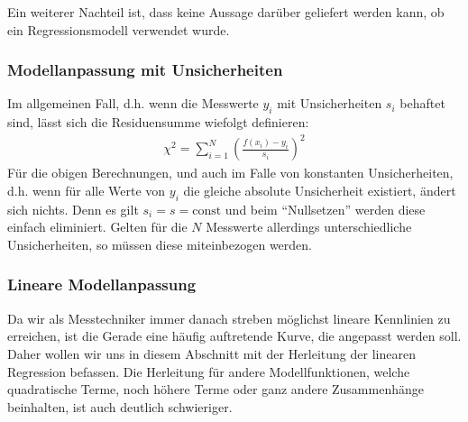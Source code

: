 \documentclass[letterpaper,10pt,english]{jupyterBook}
\begin{document}
\sphinxAtStartPar
Ein weiterer Nachteil ist, dass keine Aussage darüber geliefert werden kann, ob ein  Regressionsmodell verwendet wurde.


\subsubsection{Modellanpassung mit Unsicherheiten }
\label{\detokenize{content/1_Kurvenanpassung:modellanpassung-mit-unsicherheiten-a-id-subsec-modellanpassung-unsicherheiten-a}}
\sphinxAtStartPar
Im allgemeinen Fall, d.h. wenn die Messwerte \(y_i\) mit Unsicherheiten \(s_i\) behaftet sind, lässt sich die Residuensumme wiefolgt definieren:
\begin{equation*}
\begin{split}\chi^2 = \sum_{i=1}^N \left(\frac{f(x_i)-y_i}{s_i}\right)^2\end{split}
\end{equation*}
\sphinxAtStartPar
Für die obigen Berechnungen, und auch im Falle von konstanten Unsicherheiten, d.h. wenn für alle Werte von \(y_i\) die gleiche absolute Unsicherheit existiert, ändert sich nichts. Denn es gilt \(s_i = s = \mathrm{const}\) und beim “Nullsetzen” werden diese einfach eliminiert.
Gelten für die \(N\) Messwerte allerdings unterschiedliche Unsicherheiten, so müssen diese miteinbezogen werden.


\subsubsection{Lineare Modellanpassung }
\label{\detokenize{content/1_Kurvenanpassung:lineare-modellanpassung-a-id-subsec-lineare-modellanpassung-a}}
\sphinxAtStartPar
Da wir als Messtechniker immer danach streben möglichst lineare Kennlinien zu erreichen, ist die Gerade eine häufig auftretende Kurve, die angepasst werden soll. Daher wollen wir uns in diesem Abschnitt mit der Herleitung der linearen Regression befassen. Die Herleitung für andere Modellfunktionen, welche quadratische Terme, noch höhere Terme oder ganz andere Zusammenhänge beinhalten, ist auch deutlich schwieriger.
\end{document}
